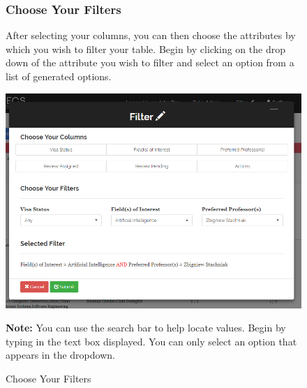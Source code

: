 \documentclass[fontsize=12pt,paper=letter,twoside]{scrartcl}
\begin{document}
\clearpage
\begin{figure}[!htb]
\subsubsection{Choose Your Filters}
After selecting your columns, you can then choose the attributes by which you wish to filter your table. Begin by clicking on the drop down of the attribute you wish to filter and select an option from a list of generated options.

\begin{center}
\includegraphics[width=.99\textwidth]{images/mr/selected_filter.png}
\end{center}
\caption{Choose Your Filters}

\smallskip
\noindent \textbf{Note:} You can use the search bar to help locate values. Begin by typing in the text box displayed. You can only select an option that appears in the dropdown.
\label{fig:choose_filters}
\end{figure} 
\end{document}
